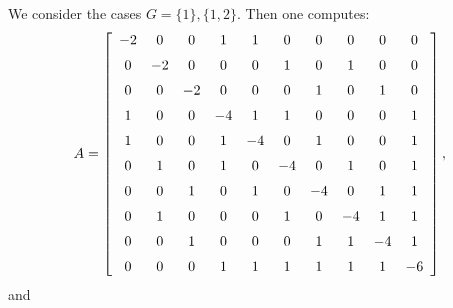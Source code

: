 \documentclass[a4paper]{amsart}
\theoremstyle{plain}
\theoremstyle{definition}
\theoremstyle{remark}
\begin{document}
We consider the cases   $ G = \{1\},  \{1,2\} $. Then one computes:
\begin{equation} \label{ASG3} 
A =
 \left[ \begin {array}{cccccccccc} -2&0&0&1&1&0&0&0&0&0
\\\noalign{\medskip}0&-2&0&0&0&1&0&1&0&0\\\noalign{\medskip}0&0&-2&0&0
&0&1&0&1&0\\\noalign{\medskip}1&0&0&-4&1&1&0&0&0&1\\\noalign{\medskip}
1&0&0&1&-4&0&1&0&0&1\\\noalign{\medskip}0&1&0&1&0&-4&0&1&0&1
\\\noalign{\medskip}0&0&1&0&1&0&-4&0&1&1\\\noalign{\medskip}0&1&0&0&0&
1&0&-4&1&1\\\noalign{\medskip}0&0&1&0&0&0&1&1&-4&1\\\noalign{\medskip}0
&0&0&1&1&1&1&1&1&-6\end {array} \right],
\end{equation} 
and  
\end{document}
